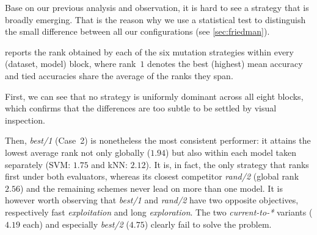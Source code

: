 \documentclass[12pt, openany]{article}
\begin{document}
Base on our previous analysis and observation, it is hard to see a strategy that is broadly emerging. That is the reason why we use a statistical test to distinguish the small difference between all our configurations (see \ref{sec:friedman}).

 reports the rank obtained by each of the six mutation strategies within every (dataset, model) block, where rank~$1$ denotes the best (highest) mean accuracy and tied accuracies share the average of the ranks they span. 

First, we can see that no strategy is uniformly dominant across all eight blocks, which confirms that the differences are too subtle to be settled by visual inspection.

Then, \textit{best/1} (Case~2) is nonetheless the most consistent performer: it attains the lowest average rank not only globally ($1.94$) but also within each model taken separately (SVM: $1.75$ and kNN: $2.12$). It is, in fact, the only strategy that ranks first under both evaluators, whereas its closest competitor \textit{rand/2} (global rank $2.56$) and the remaining schemes never lead on more than one model. It is however worth observing that \textit{best/1} and \textit{rand/2} have two opposite objectives, respectively fast \emph{exploitation} and long \emph{exploration}. The two \textit{current-to-*} variants ($4.19$ each) and especially \textit{best/2} ($4.75$) clearly fail to solve the problem.
\end{document}
